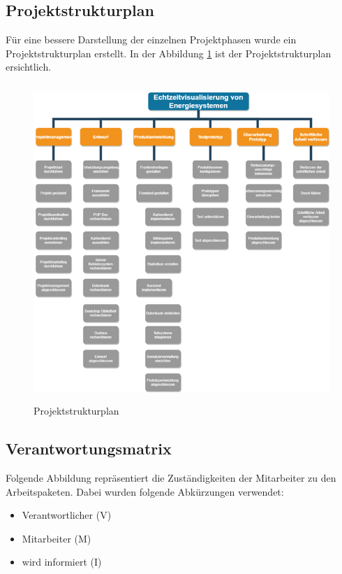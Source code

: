 \subsection{Projektstrukturplan}
Für eine bessere Darstellung der einzelnen Projektphasen wurde ein Projektstrukturplan erstellt. In der Abbildung \ref{fig:Projektstrukturplan }  ist der Projektstrukturplan ersichtlich.
\begin{figure}[h]
	\centering
	\includegraphics[height=12cm,width=14cm]{images/Projektstrukturplan}
	\caption{Projektstrukturplan}
	\label{fig:Projektstrukturplan }
\end{figure} 



\subsection{Verantwortungsmatrix}
Folgende Abbildung repräsentiert die Zuständigkeiten der Mitarbeiter zu den Arbeitspaketen.
Dabei wurden folgende Abkürzungen verwendet:
\begin{itemize}
	\item  Verantwortlicher (V)
	\item Mitarbeiter (M)
	\item wird informiert (I)
\end{itemize}

